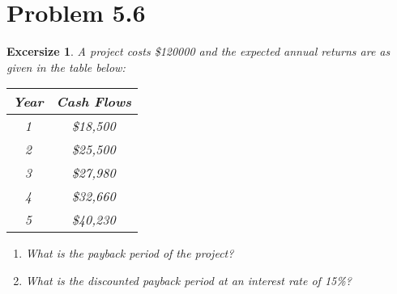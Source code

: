 \documentclass[../INDE250HW.tex]{subfiles}
\newtheorem{exrc}{Excersize}
\begin{document}
\newpage
\section*{Problem 5.6}
\begin{exrc}
    A project costs \$120000 and the expected annual returns are as given in the table below:
    \begin{center}
        \begin{tabular}{ c c }
            Year & Cash Flows \\
            \hline
            1   &   \$18,500 \\
            2   &   \$25,500 \\
            3   &   \$27,980 \\
            4   &   \$32,660 \\
            5   &   \$40,230
        \end{tabular}
    \end{center}
    \begin{enumerate}
        \item What is the payback period of the project?
        \item What is the discounted payback period at an interest rate of 15\%?
    \end{enumerate}
\end{exrc}
\end{document}
